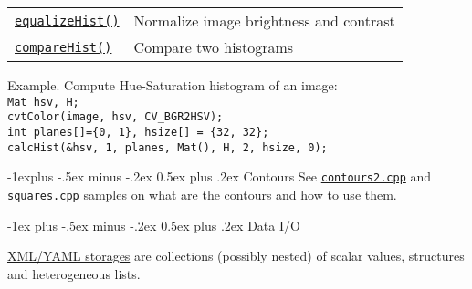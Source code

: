 \documentclass[10pt,landscape]{article}
\makeatletter
\renewcommand{\section}{\@startsection{section}{1}{0mm}%
                                {-1ex plus -.5ex minus -.2ex}%
                                {0.5ex plus .2ex}%
                                {\normalfont\large\bfseries}}
\renewcommand{\subsection}{\@startsection{subsection}{2}{0mm}%
                                {-1explus -.5ex minus -.2ex}%
                                {0.5ex plus .2ex}%
                                {\normalfont\normalsize\bfseries}}
\makeatother
\begin{document}
\begin{multicols}{3}
\begin{tabular}{@{}p{\the\MyLen}%
                @{}p{\linewidth-\the\MyLen}@{}}
\texttt{\href{http://docs.opencv.org/modules/imgproc/doc/histograms.html\#equalizehist}{equalizeHist()}} & Normalize image brightness and contrast\\

\texttt{\href{http://docs.opencv.org/modules/imgproc/doc/histograms.html\#comparehist}{compareHist()}} & Compare two histograms\\

\end{tabular}

\begin{tabbing}
Example. Compute Hue-Saturation histogram of an image:\\
\texttt{Mat hsv, H;}\\
\texttt{cvtColor(image, hsv, CV\_BGR2HSV);}\\
\texttt{int planes[]=\{0, 1\}, hsize[] = \{32, 32\};}\\
\texttt{calcHist(\&hsv, 1, planes, Mat(), H, 2, hsize, 0);}\\
\end{tabbing}

\subsection{Contours}
See \texttt{\href{http://code.opencv.org/projects/opencv/repository/revisions/master/entry/samples/cpp/contours2.cpp}{contours2.cpp}} and \texttt{\href{http://code.opencv.org/projects/opencv/repository/revisions/master/entry/samples/cpp/squares.cpp}{squares.cpp}}
samples on what are the contours and how to use them.

\section{Data I/O}

\href{http://docs.opencv.org/modules/core/doc/xml_yaml_persistence.html\#xml-yaml-file-storages-writing-to-a-file-storage}{XML/YAML storages} are collections (possibly nested) of scalar values, structures and heterogeneous lists.


\end{multicols}
\end{document}
